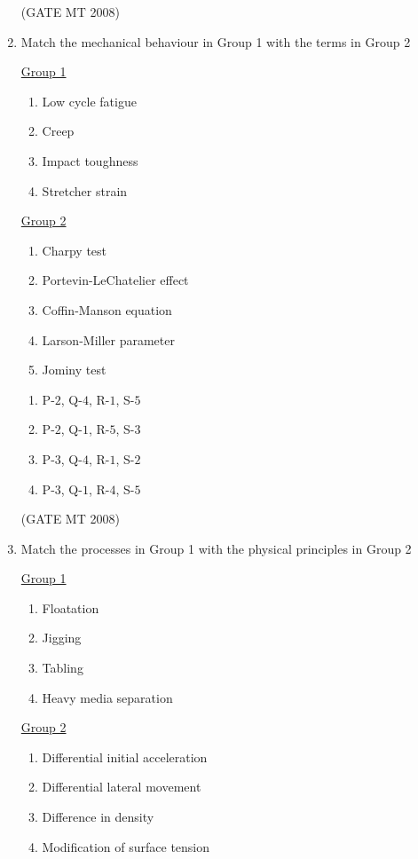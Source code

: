 \documentclass[journal, 11pt, onecolumn]{IEEEtran}
\theoremstyle{remark}
\begin{document}
\begin{enumerate}
\hfill(GATE MT 2008)

\item Match the mechanical behaviour in Group 1 with the terms in Group 2 
\begin{multicols}{2}
\underline{Group 1}
\begin{enumerate}[label=(\Alph*), start=16]
\item Low cycle fatigue
\item Creep
\item Impact toughness
\item Stretcher strain
\end{enumerate}


\underline{Group 2}
\begin{enumerate}[label=(\arabic*), start=1]
\item Charpy test
\item Portevin-LeChatelier effect
\item Coffin-Manson equation
\item Larson-Miller parameter
\item Jominy test
\end{enumerate}
\end{multicols}    

\begin{multicols}{2}
\begin{enumerate}
\item P-$2$, Q-$4$, R-$1$, S-$5$
\item P-$2$, Q-$1$, R-$5$, S-$3$
\item P-$3$, Q-$4$, R-$1$, S-$2$
\item P-$3$, Q-$1$, R-$4$, S-$5$
\end{enumerate}
\end{multicols}

\hfill(GATE MT 2008)

\item Match the processes in Group 1 with the physical principles in Group 2

\begin{multicols}{2}
\underline{Group 1}
\begin{enumerate}
\item Floatation
\item Jigging
\item Tabling
\item Heavy media separation
\end{enumerate}

\underline{Group 2}
\begin{enumerate}[label=(\arabic*), start=1]
\item Differential initial acceleration
\item Differential lateral movement
\item Difference in density
\item Modification of surface tension 
\end{enumerate}
\end{multicols}


\end{enumerate}
\end{document}
